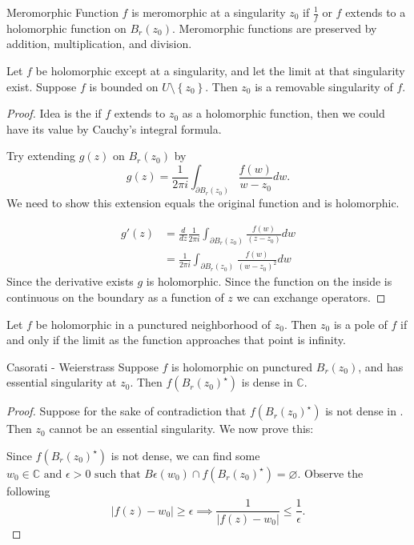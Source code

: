 \documentclass{article}
\begin{document}
\begin{defn}{Meromorphic Function}{}
\( f \) is meromorphic at a singularity \( z_0 \) if \( \frac{1}{f} \) or \( f \) extends to a holomorphic function on \( B_{r} (z_0) \). Meromorphic functions are preserved by addition, multiplication, and division.  
\end{defn}

\begin{thrm}{}{}
Let \( f \) be holomorphic except at a singularity, and let the limit at that singularity exist. Suppose \( f \) is bounded on \( U  \setminus \left\{ z_0 \right\}  \). Then \( z_{0}  \) is a removable singularity of \( f \).

\tcbline
\begin{proof}
Idea is the if \( f \) extends to  \( z_0 \) as a holomorphic function, then we could have its value by Cauchy's integral formula.

Try extending \( g(z) \) on \( B_{r} (z _0) \) by 
\[
    g(z) = \frac{1}{2\pi i} \int _{\partial B_r(z_0)} \frac{f(w)}{w - z_0} dw.
    \]
We need to show this extension equals the original function and is holomorphic. 

\begin{align*}
    g'(z) &= \frac{d}{dz}\frac{1}{2\pi i} \int _{\partial B_{r} (z_0)}  \frac{f(w)}{(z - z_0)} dw \\
    &= \frac{1}{2\pi i} \int _{\partial B_{r} (z_0)} \frac{f(w)}{(w - z_0)^{2} } dw 
\end{align*}
Since the derivative exists \( g \) is holomorphic. Since the function on the inside is continuous on the boundary as a function of \( z \) we can exchange operators. 
\end{proof}




\end{thrm}


\begin{cor}{}{}
    Let \( f \) be holomorphic in a punctured neighborhood of \( z_0 \). Then \( z_0 \)  is a pole of \( f \) if and only if the limit as the function approaches that point is infinity. 
    \end{cor}

    \begin{thrm}{Casorati - Weierstrass}{}
    Suppose \( f \) is holomorphic on punctured \( B_{r} (z_0) \), and has essential singularity at \( z_0 \). Then \( f(B_{r} (z_0)^ \star ) \) is dense in \( \mathbb{C}  \). 
    \tcbline

    \begin{proof}
    Suppose for the sake of contradiction that \( f(B_{r} (z_0)^\star ) \) is not dense in \C{}. Then \( z_0 \) cannot be an essential singularity. We now prove this:

    Since \( f(B_{r} (z_0)^\star ) \) is not dense, we can find some \( w_0 \in  \mathbb{C} \text{ and } \epsilon >0 \text{ such that } B\epsilon (w_0) \cap f(B_{r} (z_0)^\star ) = \varnothing    \). Observe the following
    \[
        \left\lvert f(z) - w_0 \right\rvert \geq \epsilon \implies \frac{1}{|f(z)- w_0|}\leq \frac{1}{\epsilon } .
    \]
    \end{proof}
    
    \end{thrm}
    
\end{document}
